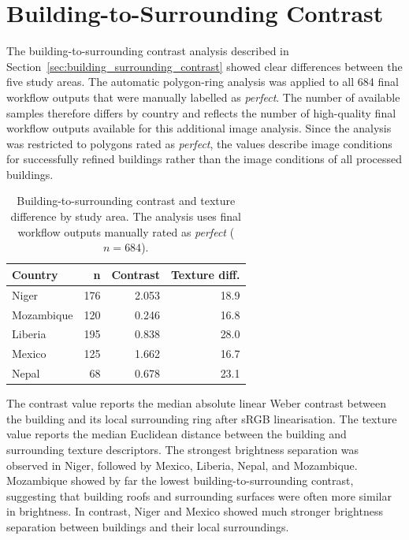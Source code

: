 \section{Building-to-Surrounding Contrast}

The building-to-surrounding contrast analysis described in Section~\ref{sec:building_surrounding_contrast} showed clear differences between the five study areas. The automatic polygon-ring analysis was applied to all 684 final workflow outputs that were manually labelled as \textit{perfect}. The number of available samples therefore differs by country and reflects the number of high-quality final workflow outputs available for this additional image analysis. Since the analysis was restricted to polygons rated as \textit{perfect}, the values describe image conditions for successfully refined buildings rather than the image conditions of all processed buildings.

\begin{table}[htb]
\centering
\caption{Building-to-surrounding contrast and texture difference by study area. The analysis uses final workflow outputs manually rated as \textit{perfect} (\(n=684\)).}
\label{tab:building_surrounding_contrast}
\footnotesize
\begin{tabular}{lrrr}
\toprule
Country &
n &
Contrast &
Texture diff. \\
\midrule
Niger      & 176 & 2.053 & 18.9 \\
Mozambique & 120 & 0.246 & 16.8 \\
Liberia    & 195 & 0.838 & 28.0 \\
Mexico     & 125 & 1.662 & 16.7 \\
Nepal      & 68  & 0.678 & 23.1 \\
\bottomrule
\end{tabular}
\end{table}

The contrast value reports the median absolute linear Weber contrast between the building and its local surrounding ring after sRGB linearisation. The texture value reports the median Euclidean distance between the building and surrounding texture descriptors. The strongest brightness separation was observed in Niger, followed by Mexico, Liberia, Nepal, and Mozambique. Mozambique showed by far the lowest building-to-surrounding contrast, suggesting that building roofs and surrounding surfaces were often more similar in brightness. In contrast, Niger and Mexico showed much stronger brightness separation between buildings and their local surroundings.

